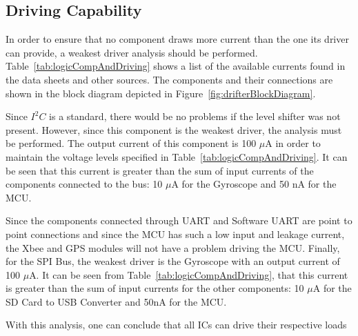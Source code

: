   \vspace{-2cm}

\subsection{Driving Capability}

In order to ensure that no component draws more current than the one its driver can provide, a weakest driver analysis should be performed. Table~\ref{tab:logicCompAndDriving} shows a list of the available currents found in the data sheets and other sources. The components and their connections are shown in the block diagram depicted in Figure~\ref{fig:drifterBlockDiagram}.

Since $I^2C$ is a standard, there would be no problems if the level shifter was not present.  However, since this component is the weakest driver, the analysis must be performed.  The output current of this component is 100 $\mu$A in order to maintain the voltage levels specified in Table~\ref{tab:logicCompAndDriving}.  It can be seen that this current is greater than the sum of input currents of the components connected to the bus: 10 $\mu$A for the Gyroscope and 50 nA for the MCU.

Since the components connected through UART and Software UART are point to point connections and since the MCU has such a low input and leakage current, the Xbee and GPS modules will not have a problem driving the MCU.  Finally, for the SPI Bus, the weakest driver is the Gyroscope with an output current of 100 $\mu$A.  It can be seen from Table~\ref{tab:logicCompAndDriving}, that this current is greater than the sum of input currents for the other components: 10 $\mu$A for the SD Card to USB Converter and 50nA for the MCU.

With this analysis, one can conclude that all ICs can drive their respective loads

